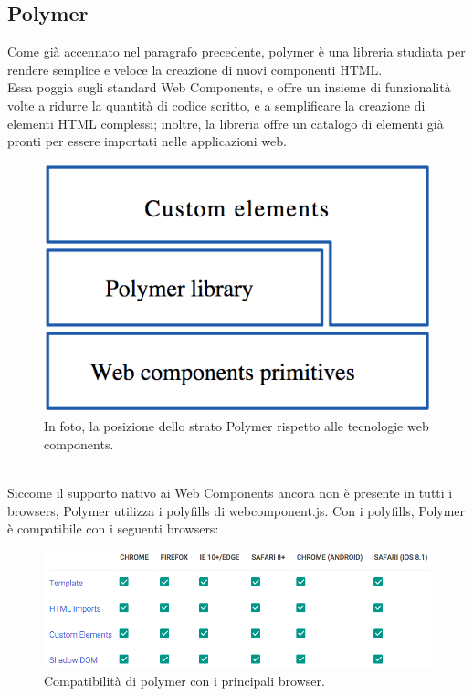 \subsection{Polymer}
\label{sec:chapter_tecnologie_abilitanti_polymer}
Come già accennato nel paragrafo precedente, polymer è una libreria studiata per rendere semplice e veloce la creazione di nuovi componenti HTML. \cite{polymer_docs}
\\
Essa poggia sugli standard Web Components, e offre un insieme di funzionalità volte a ridurre la quantità di codice scritto, e a semplificare la creazione di elementi HTML complessi; inoltre, la libreria offre un catalogo di elementi già pronti per essere importati nelle applicazioni web. \cite{polymer_project}
\\
\begin{figure}[htb]
 \centering
 \includegraphics[width=0.4\linewidth]{images/chapter_tecnologie_abilitanti/tecnologie_abilitanti_polymer_stack.png}\hfill
 \caption[Strato Polymer]{In foto, la posizione dello strato Polymer rispetto alle tecnologie web components.}
 \label{fig:tecnologie_abilitanti_polymer_stack}
\end{figure}
\\
Siccome il supporto nativo ai Web Components ancora non è presente in tutti i browsers, Polymer utilizza i polyfills di webcomponent.js. Con i polyfills, Polymer è compatibile con i seguenti browsers:
\\
\begin{figure}[htb]
 \centering
 \includegraphics[width=0.8\linewidth]{images/chapter_tecnologie_abilitanti/tecnologie_abilitanti_poly_comp.png}\hfill
 \caption[Polymer e browser compatibili]{Compatibilità di polymer con i principali browser.}
 \label{fig:tecnologie_abilitanti_poly_comp}
\end{figure}
